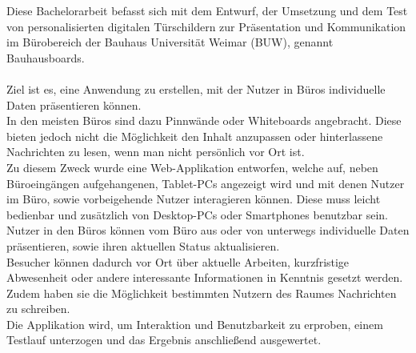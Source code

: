 Diese Bachelorarbeit befasst sich mit dem Entwurf, der Umsetzung und dem Test von personalisierten
digitalen Türschildern zur Präsentation und Kommunikation im Bürobereich der Bauhaus Universität Weimar (BUW), genannt Bauhausboards.
\\\\
Ziel ist es, eine Anwendung zu erstellen, mit der Nutzer in Büros individuelle Daten präsentieren können.
\\
In den meisten Büros sind dazu Pinnwände oder Whiteboards angebracht. Diese bieten jedoch nicht die Möglichkeit den Inhalt anzupassen oder hinterlassene Nachrichten zu lesen, wenn man nicht persönlich vor Ort ist.
\\
Zu diesem Zweck wurde eine Web-Applikation entworfen, welche auf, neben Büroeingängen aufgehangenen, Tablet-PCs angezeigt wird und mit denen Nutzer im Büro, sowie vorbeigehende Nutzer interagieren können.
Diese muss leicht bedienbar und zusätzlich von Desktop-PCs oder Smartphones benutzbar sein.
\\
Nutzer in den Büros können vom Büro aus oder von unterwegs individuelle Daten präsentieren, sowie ihren aktuellen Status aktualisieren.
\\
Besucher können dadurch vor Ort über aktuelle Arbeiten, kurzfristige Abwesenheit oder andere interessante Informationen in Kenntnis gesetzt werden. Zudem haben sie die Möglichkeit bestimmten Nutzern des Raumes Nachrichten zu schreiben.
\\
Die Applikation wird, um Interaktion und Benutzbarkeit zu erproben, einem Testlauf unterzogen und das Ergebnis anschließend ausgewertet.